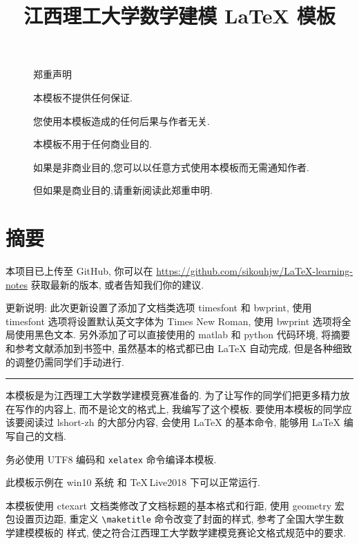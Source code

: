 \documentclass[timesfont,no-math]{JXUSTmodeling}%
\title{江西理工大学数学建模 \LaTeX{} 模板}%
\begin{document}
	\maketitle%

	\newpage
	\begin{figure}[!ht]
		\centering
		\heiti{} {\color{red}郑重声明}
		
		本模板不提供任何保证. 
		
		您使用本模板造成的任何后果与作者无关.
		
		本模板不用于任何商业目的.
		
		如果是非商业目的,您可以以任意方式使用本模板而无需通知作者.
		
		但如果是商业目的,请{\color{red}重新阅读}此郑重申明.
	\end{figure}
\thispagestyle{empty}
	
	
	\newpage
	\section*{摘\hspace{24bp}要}%
	{ 本项目已上传至 GitHub, 你可以在 \url{https://github.com/sikouhjw/LaTeX-learning-notes} 获取最新的版本, 或者告知我们你的建议.}
	
	\vspace{1em}
	
	更新说明: 此次更新设置了添加了文档类选项 timesfont 和 bwprint, 使用 timesfont 选项将设置默认英文字体为 Times New Roman, 使用 
	 bwprint 选项将全局使用黑色文本. 另外添加了可以直接使用的 matlab 和 python 代码环境, 将摘要和参考文献添加到书签中, 
	虽然基本的格式都已由 \LaTeX{} 自动完成, 但是各种细致的调整仍需同学们手动进行.
	
	\noindent\rule{\textwidth}{1pt}

	本模板是为江西理工大学数学建模竞赛准备的. 为了让写作的同学们把更多精力放在写作的内容上, 
	而不是论文的格式上, 我编写了这个模板. 要使用本模板的同学应该要阅读过 lshort-zh \cite{lshort-zh} 的大部分内容,
	会使用 \LaTeX{} 的基本命令, 能够用 \LaTeX{} 编写自己的文档.
	
	务必使用 UTF8 编码和 \texttt{xelatex} 命令编译本模板.
	
	此模板示例在 win10 系统 和 \TeX\,Live2018 下可以正常运行.
	
	本模板使用 ctexart 文档类\cite{ctex-package}修改了文档标题的基本格式和行距, 使用 geometry 宏包设置页边距, 
	重定义 \verb|\maketitle|\cite{classes} 命令改变了封面的样式, 参考了全国大学生数学建模模板\cite{CUMCMThesis}的
	样式, 使之符合江西理工大学数学建模竞赛论文格式规范中的要求.
	
\end{document}
